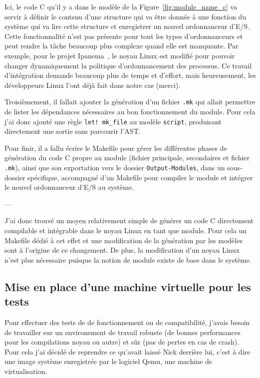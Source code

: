 Ici, le code C qu'il y a dans le modèle de la Figure~\ref{fig:module_name_c} va 
servir à définir le contenu d'une structure qui va être donnée à une fonction 
du système qui va lire cette structure et enregistrer un nouvel ordonnanceur 
d'E/S. Cette fonctionnalité n'est pas présente pour tout les types 
d'ordonnanceurs et peut rendre la tâche beaucoup plus complexe quand elle est 
manquante. Par exemple, pour le projet Ipanema~\cite{lepers2020provable}, le 
noyau Linux est modifié pour pouvoir changer dynamiquement la politique 
d'ordonnancement des processus. Ce travail d'intégration demande beaucoup plus 
de temps et d'effort, mais heureusement, les développeurs Linux l'ont déjà fait 
dans notre cas (merci).

Troisièmement, il fallait ajouter la génération d'un fichier \texttt{.mk} qui 
allait permettre de lister les dépendances nécessaires au bon fonctionnement du 
module. Pour cela j'ai donc ajouté une règle \texttt{let! mk\_file} au modèle 
\texttt{script}, produisant directement une sortie sans parcourir l'AST.

Pour finir, il a fallu écrire le Makefile pour gérer les différentes phases de 
génération du code C propre au module (fichier principale, secondaires et 
fichier \texttt{.mk}), ainsi que son exportation vers le dossier \texttt
{Output-Modules}, dans un sous-dossier spécifique, accompagné d'un Makefile 
pour compiler le module et intégrer le nouvel ordonnanceur d'E/S au système.

\begin{center}
---
\end{center}
    
J'ai donc trouvé un moyen relativement simple de générer un code C directement 
compilable et intégrable dans le noyau Linux en tant que module. Pour cela un 
Makefile dédié à cet effet et une modification de la génération par les modèles 
sont à l'origine de ce changement. De plus, la modification d'un noyau Linux 
n'est plus nécessaire puisque la notion de module existe de base dans le 
système.

\subsection{Mise en place d'une machine virtuelle pour les tests}

Pour effectuer des tests de de fonctionnement ou de compatibilité, j'avais besoin de travailler sur un environement de travail robuste (de bonnes performances pour les compilations noyau ou autre) et sûr (pas de pertes en cas de crash). Pour cela j'ai décidé de reprendre ce qu'avait laissé Nick derrière lui, c'est à dire une image système enregistrée par le logiciel Qemu, une machine de virtualisation.


